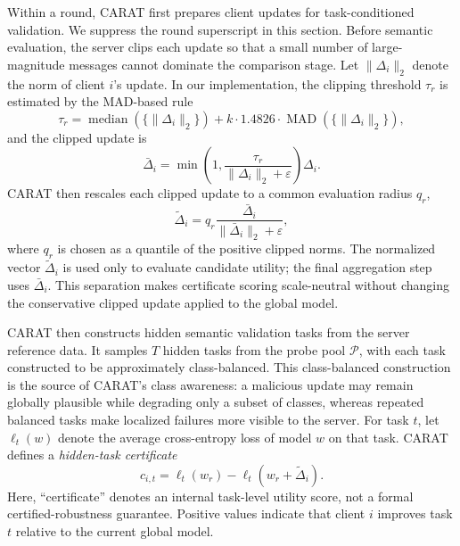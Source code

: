 \documentclass{article}
\begin{document}
Within a round, CARAT first prepares client updates for task-conditioned validation. We suppress the round superscript in this section. Before semantic evaluation, the server clips each update so that a small number of large-magnitude messages cannot dominate the comparison stage. Let $\|\Delta_i\|_2$ denote the norm of client $i$'s update. In our implementation, the clipping threshold $\tau_r$ is estimated by the MAD-based rule
\begin{equation}
\tau_r = \operatorname{median}(\{\|\Delta_i\|_2\}) +
k \cdot 1.4826 \cdot \operatorname{MAD}(\{\|\Delta_i\|_2\}),
\label{eq:clip}
\end{equation}
and the clipped update is
\begin{equation}
\bar{\Delta}_i = \min\left(1, \frac{\tau_r}{\|\Delta_i\|_2 + \varepsilon}\right)\Delta_i.
\end{equation}
CARAT then rescales each clipped update to a common evaluation radius $q_r$,
\begin{equation}
\tilde{\Delta}_i = q_r \frac{\bar{\Delta}_i}{\|\bar{\Delta}_i\|_2 + \varepsilon},
\label{eq:normalize}
\end{equation}
where $q_r$ is chosen as a quantile of the positive clipped norms. The normalized vector $\tilde{\Delta}_i$ is used only to evaluate candidate utility; the final aggregation step uses $\bar{\Delta}_i$. This separation makes certificate scoring scale-neutral without changing the conservative clipped update applied to the global model.

CARAT then constructs hidden semantic validation tasks from the server reference data. It samples $T$ hidden tasks from the probe pool $\mathcal{P}$, with each task constructed to be approximately class-balanced. This class-balanced construction is the source of CARAT's class awareness: a malicious update may remain globally plausible while degrading only a subset of classes, whereas repeated balanced tasks make localized failures more visible to the server. For task $t$, let $\ell_t(w)$ denote the average cross-entropy loss of model $w$ on that task. CARAT defines a \emph{hidden-task certificate}
\begin{equation}
c_{i,t} = \ell_t(w_r) - \ell_t(w_r + \tilde{\Delta}_i).
\label{eq:cert}
\end{equation}
Here, ``certificate'' denotes an internal task-level utility score, not a formal certified-robustness guarantee. Positive values indicate that client $i$ improves task $t$ relative to the current global model.
\end{document}
